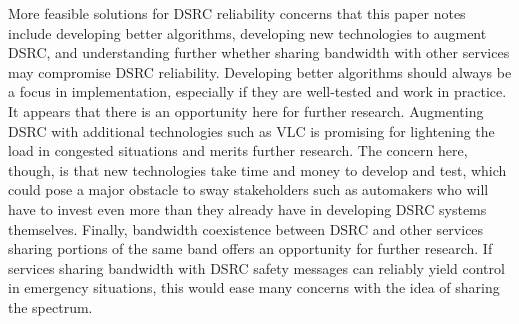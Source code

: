 \documentclass[twoside,conference]{IEEEtran}
\begin{document}
	More feasible solutions for DSRC reliability concerns that this paper notes include developing better algorithms, developing new technologies to augment DSRC, and understanding further whether sharing bandwidth with other services may compromise DSRC reliability. Developing better algorithms should always be a focus in implementation, especially if they are well-tested and work in practice. It appears that there is an opportunity here for further research. Augmenting DSRC with additional technologies such as VLC is promising for lightening the load in congested situations and merits further research. The concern here, though, is that new technologies take time and money to develop and test, which could pose a major obstacle to sway stakeholders such as automakers who will have to invest even more than they already have in developing DSRC systems themselves. Finally, bandwidth coexistence between DSRC and other services sharing portions of the same band offers an opportunity for further research. If services sharing bandwidth with DSRC safety messages can reliably yield control in emergency situations, this would ease many concerns with the idea of sharing the spectrum.
	



\end{document}
